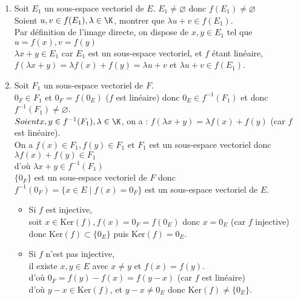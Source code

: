 \documentclass[12pt, a4paper]{report}
\begin{document}
\begin{remarque}{}
\begin{demo}{}
\begin{enumerate}
	\item Soit $E_1$ un sous-espace vectoriel de $E$. $E_1 \ne \varnothing$ donc $f(E_1) \ne \varnothing$ \\
	Soient $u,v \in f(E_1), \lambda \in \K$, montrer que $\lambda u + v \in f(E_1)$. \\
	Par définition de l'image directe, on dispose de $x,y \in E_1$ tel que $u = f(x), v = f(y)$ \\
	$\lambda x + y \in E_1$ car $E_1$ est un sous-espace vectoriel, et $f$ étant linéaire, $f(\lambda x + y) = \lambda f(x)+f(y) = \lambda u+v$ et $	\lambda u + v \in f(E_1)$. \\

	\item Soit $F_1$ un sous-espace vectoriel de $F$. \\
	$0_F \in F_1$ et $0_F = f(0_E)$ ($f$ est linéaire) donc $0_E \in f^{-1}(F_1)$ et donc $f^{-1}(F_1) \ne \varnothing$. \\
	$Soient x,y \in f^{-1}(F_1), \lambda \in \K$, on a : $f(\lambda x + y) = \lambda f(x) + f(y)$ (car $f$ est linéaire). \\
	On a $f(x) \in F_1, f(y) \in F_1$ et $F_1$ est un sous-espace vectoriel donc $\lambda f(x) + f(y) \in F_1$\\
	d'où $\lambda x + y \in f^{-1}(F_1)$ \\
	$\{0_F\}$ est un sous-espace vectoriel de $F$ donc $f^{-1}(0_F) = \{x \in E \mid f(x) = 0_F \}$ est un sous-espace vectoriel de $E$. \\
	\begin{itemize}
		\item Si $f$ est injective, \\
		soit $x \in \text{Ker}(f), f(x) =0_F = f(0_E)$ donc $x=0_E$ (car $f$ injective) donc $\text{Ker}(f) \subset \{0_E\}$ puis $\text{Ker}(f) = 0_E$.
		\item Si $f$ n'est pas injective, \\
		il existe $x,y \in E$ avec $x \ne y$ et $f(x) = f(y)$. \\
		d'où $0_F = f(y)-f(x) = f(y-x)$ (car $f$ est linéaire) \\
		d'où $y-x \in \text{Ker}(f)$, et $y-x \ne 0_E$ donc $\text{Ker}(f) \ne \{0_E\}$.
	\end{itemize}
\end{enumerate}
\end{demo}


\end{remarque}
\end{document}
